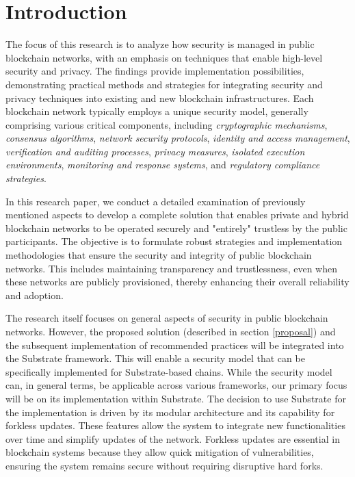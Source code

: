 \section{Introduction}
The focus of this research is to analyze how security is managed in public blockchain networks, with an emphasis on techniques that enable high-level security and privacy. The findings provide implementation possibilities, demonstrating practical methods and strategies for integrating security and privacy techniques into existing and new blockchain infrastructures. Each blockchain network typically employs a unique security model, generally comprising various critical components, including \textit{cryptographic mechanisms}, \textit{consensus algorithms}, \textit{network security protocols}, \textit{identity and access management}, \textit{verification and auditing processes}, \textit{privacy measures}, \textit{isolated execution environments}, \textit{monitoring and response systems}, and \textit{regulatory compliance strategies}.

In this research paper, we conduct a detailed examination of previously mentioned aspects to develop a complete solution that enables private and hybrid blockchain networks to be operated securely and "entirely" trustless by the public participants. The objective is to formulate robust strategies and implementation methodologies that ensure the security and integrity of public blockchain networks. This includes maintaining transparency and trustlessness, even when these networks are publicly provisioned, thereby enhancing their overall reliability and adoption.

The research itself focuses on general aspects of security in public blockchain networks. However, the proposed solution (described in section \ref{proposal}) and the subsequent implementation of recommended practices will be integrated into the Substrate framework. This will enable a security model that can be specifically implemented for Substrate-based chains. While the security model can, in general terms, be applicable across various frameworks, our primary focus will be on its implementation within Substrate. The decision to use Substrate for the implementation is driven by its modular architecture and its capability for forkless updates. These features allow the system to integrate new functionalities over time and simplify updates of the network. Forkless updates are essential in blockchain systems because they allow quick mitigation of vulnerabilities, ensuring the system remains secure without requiring disruptive hard forks.

